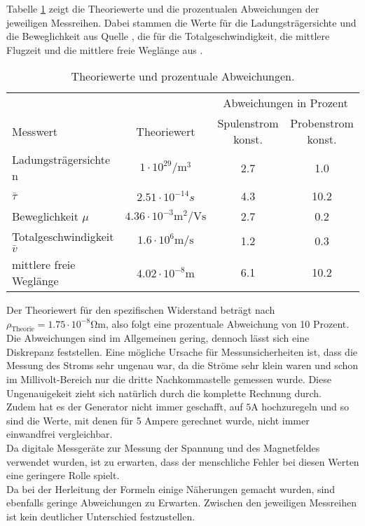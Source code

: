 Tabelle \ref{tab:theo} zeigt die Theoriewerte und die prozentualen Abweichungen 
der jeweiligen Messreihen. Dabei stammen die Werte für die Ladungsträgersichte und
die Beweglichkeit aus Quelle \cite{beweglichkeit}, die für die Totalgeschwindigkeit,
die mittlere Flugzeit und die mittlere freie Weglänge aus \cite{transport}. 
\begin{table}[H]
 \centering
 \caption{Theoriewerte und prozentuale Abweichungen.}
 \label{tab:theo}
 \begin{tabular}{lccc}
  \toprule
   & & \multicolumn{2}{c}{Abweichungen in Prozent}\\
  \cmidrule(lr){3-4}
  Messwert & Theoriewert & Spulenstrom konst. & Probenstrom konst. \\
  \midrule
  Ladungsträgersichte n & $1 \cdot 10^{29} \si{\per\m\cubed}$ & 2.7 & 1.0\\
  $\bar{\tau}$ & $2.51 \cdot 10^{-14} \si{s}$ & 4.3 & 10.2\\
  Beweglichkeit $\mu$ & $4.36 \cdot 10^{-3} \si{\m\squared\per\volt\s}$ & 2.7 & 0.2 \\
  Totalgeschwindigkeit $\bar{v}$ & $1.6 \cdot 10^{6} \si{\m\per\s}$ & 1.2 & 0.3 \\
  mittlere freie Weglänge & $4.02 \cdot 10^{-8} \si{\m}$ & 6.1 & 10.2 \\
  \bottomrule
 \end{tabular}
\end{table}
\noindent Der Theoriewert für den spezifischen Widerstand beträgt nach \cite{spezid} 
$\rho_\text{Theorie} = 1.75 \cdot 10^{-8} \si{\ohm\m}$, also folgt eine prozentuale 
Abweichung von 10 Prozent.\\
Die Abweichungen sind im Allgemeinen gering, dennoch lässt sich eine Diskrepanz feststellen.
Eine mögliche Ursache für Messunsicherheiten ist, dass die Messung des Stroms sehr ungenau
war, da die Ströme sehr klein waren und schon im Millivolt-Bereich nur 
die dritte Nachkommastelle gemessen wurde. Diese Ungenauigekeit zieht sich
natürlich durch die komplette Rechnung durch.\\
Zudem hat es der Generator nicht immer geschafft, auf $5 \si{\A}$ hochzuregeln
und so sind die Werte, mit denen für 5 Ampere gerechnet wurde, nicht immer einwandfrei
vergleichbar. \\
Da digitale Messgeräte zur Messung der Spannung und des Magnetfeldes verwendet
wurden, ist zu erwarten, dass der menschliche Fehler bei diesen Werten eine geringere
Rolle spielt.\\
Da bei der Herleitung der Formeln einige Näherungen gemacht wurden, sind ebenfalls geringe
Abweichungen zu Erwarten.
Zwischen den jeweiligen Messreihen ist kein deutlicher Unterschied festzustellen.